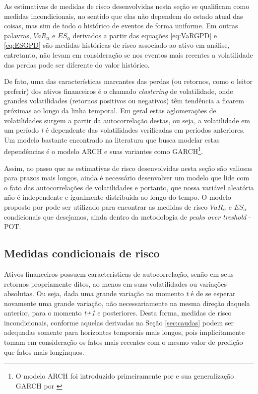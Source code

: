\documentclass[review]{elsarticle}
\theoremstyle{definition}
\begin{document}
As estimativas de medidas de risco desenvolvidas nesta seção se qualificam como medidas incondicionais, no sentido que elas não dependem do estado atual das coisas, mas sim de todo o histórico de eventos de forma uniforme. Em outras palavras, $VaR_\alpha \text{ e } ES_\alpha$ derivados a partir das equações \eqref{eq:VaRGPD} e \eqref{eq:ESGPD} são medidas históricas de risco associado ao ativo em análise, entretanto, não levam em consideração se nos eventos mais recentes a volatilidade das perdas pode ser diferente do valor histórico.

De fato, uma das características marcantes das perdas (ou retornos, como o leitor preferir) dos ativos financeiros é o chamado \emph{clustering} de volatilidade, onde grandes volatilidades (retornos positivos ou negativos) têm tendência a ficarem próximas ao longo da linha temporal. Em geral estas aglomerações de volatilidades surgem a partir da autocorrelação destas, ou seja, a volatilidade em um período \emph{t} é dependente das volatilidades verificadas em períodos anteriores. Um modelo bastante encontrado na literatura que busca modelar estas dependências é o modelo ARCH e suas variantes como GARCH\footnote{O modelo ARCH foi introduzido primeiramente por \cite{Engle1982} e sua generalização GARCH por \cite{Bollerslev1986}}.

Assim, ao passo que as estimativas de risco desenvolvidas nesta seção são valiosas para prazos mais longos, ainda é necessário desenvolver um modelo que lide com o fato das autocorrelações de volatilidades e portanto, que nossa variável aleatória não é independente e igualmente distribuída ao longo do tempo. O modelo proposto por \cite{McNeil2000} pode ser utilizado para encontrar as medidas de risco $VaR_\alpha$ e $ES_\alpha$ condicionais que desejamos, ainda dentro da metodologia de \emph{peaks over treshold} - POT.

\subsection{Medidas condicionais de risco}
\label{sec:riscocond}

Ativos financeiros possuem características de autocorrelação, senão em seus retornos propriamente ditos, ao menos em suas volatilidades ou variações absolutas. Ou seja, dada uma grande variação no momento \emph{t} é de se esperar novamente uma grande variação, não necessariamente na mesma direção daquela anterior, para o momento \emph{t+1} e posteriores. Desta forma, medidas de risco incondicionais, conforme aquelas derivadas na Seção \ref{sec:caudas} podem ser adequadas somente para horizontes temporais mais longos, pois implicitamente tomam em consideração os fatos mais recentes com o mesmo valor de predição que fatos mais longínquos.
\end{document}
